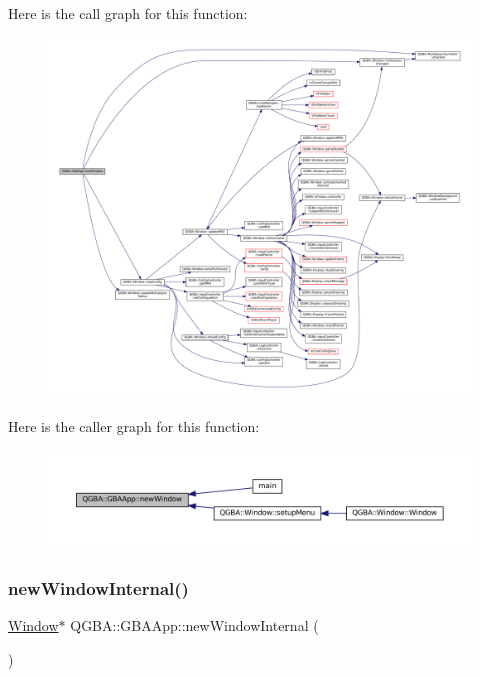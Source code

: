 Here is the call graph for this function\+:
\nopagebreak
\begin{figure}[H]
\begin{center}
\leavevmode
\includegraphics[width=350pt]{class_q_g_b_a_1_1_g_b_a_app_aa1eef91286be508318f3416141f427a7_cgraph}
\end{center}
\end{figure}
Here is the caller graph for this function\+:
\nopagebreak
\begin{figure}[H]
\begin{center}
\leavevmode
\includegraphics[width=350pt]{class_q_g_b_a_1_1_g_b_a_app_aa1eef91286be508318f3416141f427a7_icgraph}
\end{center}
\end{figure}
\mbox{\label{class_q_g_b_a_1_1_g_b_a_app_a5c8986a8bd50f2dfc0ba2cf82212e57f}} 
\subsubsection{\texorpdfstring{new\+Window\+Internal()}{newWindowInternal()}}
{\footnotesize\ttfamily \mbox{\hyperlink{class_q_g_b_a_1_1_window}{Window}}$\ast$ Q\+G\+B\+A\+::\+G\+B\+A\+App\+::new\+Window\+Internal (\begin{DoxyParamCaption}{ }\end{DoxyParamCaption})\hspace{0.3cm}{\ttfamily [private]}}

